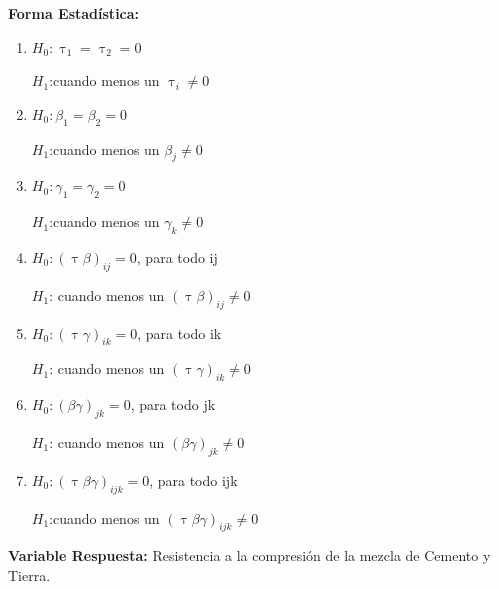 \documentclass[12pt,letterpaper]{report}
\begin{document}
\textbf{Forma Estadística:}
\begin{enumerate}
  \item $H_0: \uptau_1 = \uptau_2 = 0$
  
        $H_1$:cuando menos un $\uptau_i \not= 0$                     
  \item $H_0:\beta_1 = \beta_2 = 0$ 
  
        $H_1$:cuando menos un $\beta_j \not= 0$                                   
  \item $H_0: \gamma_1 = \gamma_2 =0$  
  
        $H_1$:cuando menos un $\gamma_k \not= 0$                       
  \item $H_0: (\uptau\beta)_{ij} = 0$, para todo ij   
  
        $H_1$: cuando menos un $(\uptau\beta)_{ij} \not= 0$                   
  \item $H_0: (\uptau\gamma)_{ik} = 0$, para todo ik
  
        $H_1$: cuando menos un $(\uptau\gamma)_{ik} \not= 0$
  \item $H_0: (\beta\gamma)_{jk} = 0$, para todo jk
  
        $H_1$: cuando menos un $(\beta\gamma)_{jk} \not= 0$
  \item $H_0: (\uptau\beta\gamma)_{ijk} = 0$, para todo ijk
  
        $H_1$:cuando menos un  $(\uptau\beta\gamma)_{ijk} \not= 0$
\end{enumerate}

\textbf{Variable Respuesta:} Resistencia a la compresión de la mezcla de Cemento y Tierra.
\end{document}
